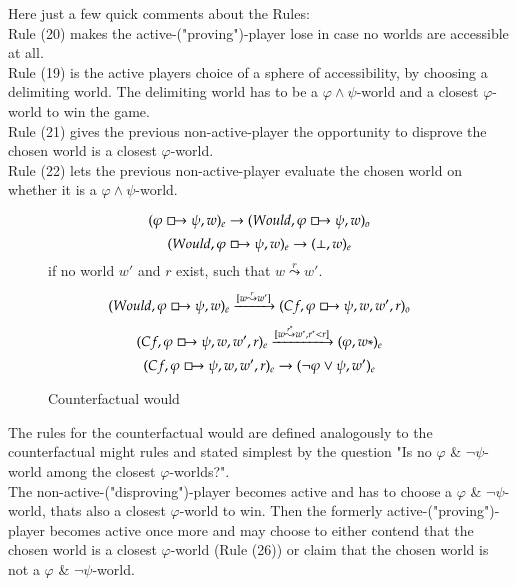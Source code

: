 \documentclass[a4paper,american]{paper}
\begin{document}
	Here just a few quick comments about the Rules: \\
	Rule (20) makes the active-("proving")-player lose in case no worlds are accessible at all. \\
	Rule (19) is the active players choice of a sphere of accessibility, by choosing a delimiting world. The delimiting world has to be a $\varphi\wedge\psi$-world and a closest $\varphi$-world to win the game.\\
	Rule (21) gives the previous non-active-player the opportunity to disprove the chosen world is a closest $\varphi$-world. \\
	Rule (22) lets the previous non-active-player evaluate the chosen world on whether it is a $\varphi\wedge\psi$-world.
\begin{figure}[H]
	\centering
	\begin{equation}
		(\varphi\boxright\psi ,w)_e\rightarrow (Would,\varphi\boxright\psi ,w)_o
	\end{equation}
	\begin{equation}
		(Would,\varphi\boxright\psi ,w)_e\rightarrow (\bot ,w)_e
	\end{equation}
	if no world $w'$ and $r$ exist, such that $w\overset{r}{\leadsto}w'$.
	\begin{equation}
		(Would,\varphi\boxright\psi ,w)_e\xrightarrow{[w\overset{r}{\leadsto}w']} (Cf,\varphi\boxright\psi ,w,w',r)_o
	\end{equation}
	\begin{equation}
		(Cf,\varphi\boxright\psi ,w,w',r)_e\xrightarrow{[w\overset{r^*}{\leadsto}w^*,r^*< r]} (\varphi ,w*)_e
	\end{equation}
	\begin{equation}
		(Cf,\varphi\boxright\psi ,w,w',r)_e\rightarrow (\neg\varphi\vee\psi ,w')_e
	\end{equation}
	\caption{Counterfactual would}
	\label{fig:counterfactual_would_rules}
\end{figure}
	The rules for the counterfactual would are defined analogously to the counterfactual might rules and stated simplest by the question "Is no $\varphi$ \& $\neg\psi$-world among the closest $\varphi$-worlds?". \\
	The non-active-("disproving")-player becomes active and has to choose a $\varphi$ \& $\neg\psi$-world, thats also a closest $\varphi$-world to win. Then the formerly active-("proving")-player becomes active once more and may choose to either contend that the chosen world is a closest $\varphi$-world (Rule (26)) or claim that the chosen world is not a $\varphi$ \& $\neg\psi$-world. \\
\end{document}

